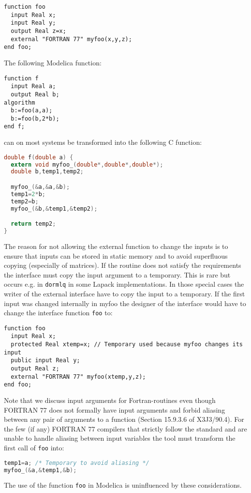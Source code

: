 \begin{example}
\begin{lstlisting}[language=modelica]
function foo
  input Real x;
  input Real y;
  output Real z=x;
  external "FORTRAN 77" myfoo(x,y,z);
end foo;
\end{lstlisting}
The following Modelica function:
\begin{lstlisting}[language=modelica]
function f
  input Real a;
  output Real b;
algorithm
  b:=foo(a,a);
  b:=foo(b,2*b);
end f;
\end{lstlisting}
can on most systems be transformed into the following C function:
\begin{lstlisting}[language=C]
double f(double a) {
  extern void myfoo_(double*,double*,double*);
  double b,temp1,temp2;

  myfoo_(&a,&a,&b);
  temp1=2*b;
  temp2=b;
  myfoo_(&b,&temp1,&temp2);

  return temp2;
}
\end{lstlisting}

The reason for not allowing the external function to change the
inputs is to ensure that inputs can be stored in static memory and to
avoid superfluous copying (especially of matrices). If the routine does
not satisfy the requirements the interface must copy the input argument
to a temporary. This is rare but occurs e.g. in \lstinline!dormlq! in some
Lapack implementations. In those special cases the writer of the
external interface have to copy the input to a temporary. If the first
input was changed internally in myfoo the designer of the interface
would have to change the interface function \lstinline!foo! to:
\begin{lstlisting}[language=modelica]
function foo
  input Real x;
  protected Real xtemp=x; // Temporary used because myfoo changes its input
  public input Real y;
  output Real z;
  external "FORTRAN 77" myfoo(xtemp,y,z);
end foo;
\end{lstlisting}

Note that we discuss input arguments for Fortran-routines even
though FORTRAN 77 does not formally have input arguments and forbid
aliasing between any pair of arguments to a function (Section 15.9.3.6
of X3J3/90.4). For the few (if any) FORTRAN 77 compilers that strictly
follow the standard and are unable to handle aliasing between input
variables the tool must transform the first call of \lstinline!foo! into:
\begin{lstlisting}[language=C]
temp1=a; /* Temporary to avoid aliasing */
myfoo_(&a,&temp1,&b);
\end{lstlisting}

The use of the function \lstinline!foo! in Modelica is uninfluenced by these considerations.
\end{example}

